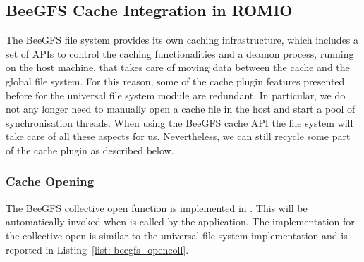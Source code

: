 \subsection{BeeGFS Cache Integration in ROMIO}
The BeeGFS file system provides its own caching infrastructure, which includes a set of APIs to control the caching functionalities and a deamon process, running on the host machine, that takes care of moving data between the cache and the global file system. For this reason, some of the cache plugin features presented before for the universal file system module are redundant. In particular, we do not any longer need to manually open a cache file in the host and start a pool of synchronisation threads. When using the BeeGFS cache API the file system will take care of all these aspects for us. Nevertheless, we can still recycle some part of the cache plugin as described below.

\subsubsection{Cache Opening}
The BeeGFS collective open function is implemented in . This will be automatically invoked when  is called by the application. The implementation for the collective open is similar to the universal file system implementation and is reported in Listing~\ref{list: beegfs_opencoll}.

